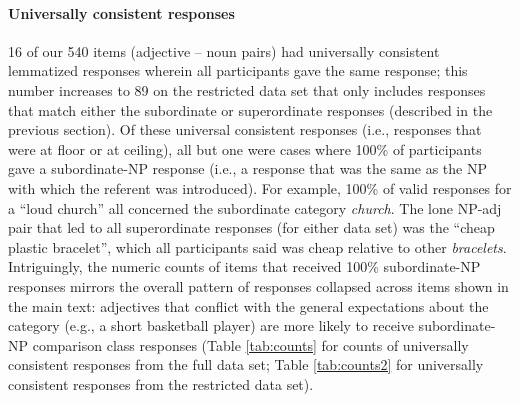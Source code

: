 \documentclass[doc]{apa6}
\begin{document}
\paragraph{Universally consistent responses}

16 of our 540 items (adjective -- noun pairs) had universally consistent lemmatized responses wherein all participants gave the same response; this number increases to 89 on the restricted data set that only includes responses that match either the subordinate or superordinate responses (described in the previous section). 
Of these universal consistent responses (i.e., responses that were at floor or at ceiling), all but one were cases where 100\% of participants gave a subordinate-NP response (i.e., a response that was the same as the NP with which the referent was introduced). 
For example, 100\% of valid responses for a ``loud church'' all concerned the subordinate category \emph{church}. 
The lone NP-adj pair that led to all superordinate responses (for either data set) was the ``cheap plastic bracelet'', which all participants said was cheap relative to other \emph{bracelets}. 
Intriguingly, the numeric counts of items that received 100\% subordinate-NP responses mirrors the overall pattern of responses collapsed across items shown in the main text: adjectives that conflict with the general expectations about the category (e.g., a short basketball player) are more likely to receive subordinate-NP comparison class responses (Table \ref{tab:counts} for counts of universally consistent responses from the full data set; Table \ref{tab:counts2} for universally consistent responses from the restricted data set).
\end{document}

